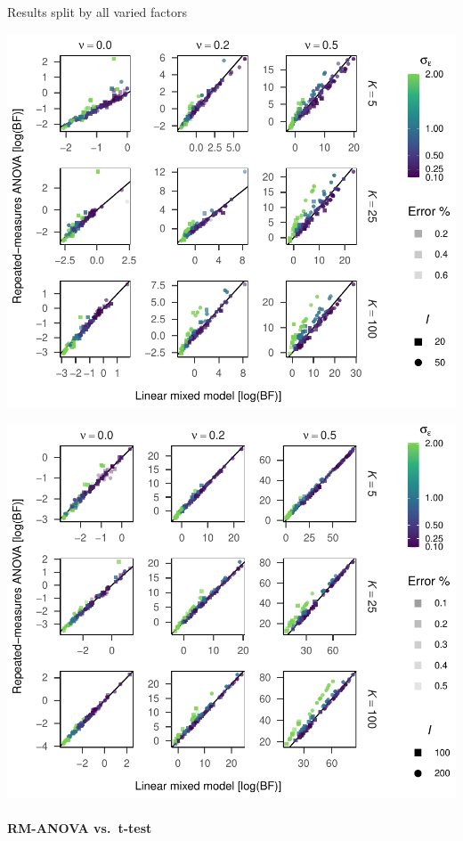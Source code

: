 \documentclass[
  a4paper,
  DIV=11,
  numbers=noendperiod,
  oneside]{scrartcl}
\let\oldparagraph\paragraph
\renewcommand{\paragraph}[1]{\oldparagraph{#1}\mbox{}}
\begin{document}
Results split by all varied factors

\includegraphics{prior_translation_files/figure-pdf/simulation-results2-details-1.pdf}

\includegraphics{prior_translation_files/figure-pdf/simulation-results2-details-2.pdf}

\hypertarget{rm-anova-vs.-t-test}{%
\paragraph{RM-ANOVA vs.~t-test}\label{rm-anova-vs.-t-test}}
\end{document}

